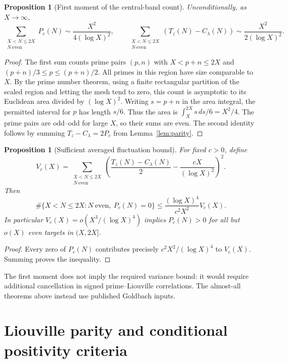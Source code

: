 \documentclass[final,11pt]{elsarticle}
\newtheorem{proposition}[theorem]{Proposition}
\theoremstyle{definition}
\theoremstyle{remark}
\numberwithin{equation}{section}
\begin{document}
\begin{proposition}[First moment of the central-band count]
\label{prop:central-first-moment}
Unconditionally, as $X\to\infty$,
\[
\sum_{\substack{X<N\le2X\\N\ \mathrm{even}}}P_c(N)
\sim \frac{X^2}{4(\log X)^2},
\qquad
\sum_{\substack{X<N\le2X\\N\ \mathrm{even}}}
 (T_z(N)-C_\lambda(N))
\sim\frac{X^2}{2(\log X)^2}.
\]
\end{proposition}
\begin{proof}
The first sum counts prime pairs $(p,n)$ with
$X<p+n\le2X$ and $(p+n)/3\le p\le(p+n)/2$.
All primes in this region have size comparable to $X$.
By the prime number theorem, using a finite rectangular partition
of the scaled region and letting the mesh tend to zero, this count is
asymptotic to its Euclidean area divided by $(\log X)^2$.
Writing $s=p+n$ in the area integral, the permitted interval
for $p$ has length $s/6$.  Thus the area is
$\int_X^{2X}s\,ds/6=X^2/4$.
The prime pairs are odd--odd for large $X$, so their sums are even.
The second identity follows by summing
$T_z-C_\lambda=2P_c$ from Lemma~\ref{lem:parity}.
\end{proof}

\begin{proposition}[Sufficient averaged fluctuation bound]
\label{prop:dimensional-variance}
For fixed $c>0$, define
\[
V_c(X)=\sum_{\substack{X<N\le2X\\N\ \mathrm{even}}}
\left(\frac{T_z(N)-C_\lambda(N)}2
             -\frac{cX}{(\log X)^2}\right)^2.
\]
Then
\[
\#\{X<N\le2X:N\ \mathrm{even},\ P_c(N)=0\}
\le\frac{(\log X)^4}{c^2X^2}V_c(X).
\]
In particular $V_c(X)=o(X^3/(\log X)^4)$ implies
$P_c(N)>0$ for all but $o(X)$ even targets in $(X,2X]$.
\end{proposition}
\begin{proof}
Every zero of $P_c(N)$ contributes precisely
$c^2X^2/(\log X)^4$ to $V_c(X)$.  Summing proves the inequality.
\end{proof}

The first moment does not imply the required variance bound: it would
require additional cancellation in signed prime--Liouville correlations.
The almost-all theorems above instead use published Goldbach inputs.


\section{Liouville parity and conditional positivity criteria}\label{sec:parity}
\end{document}
